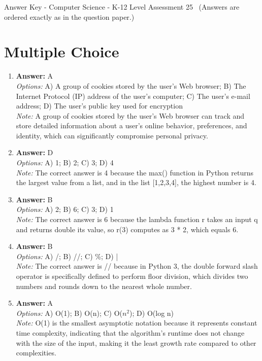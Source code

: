 \documentclass[12pt]{article}
\begin{document}
\begin{center}
Answer Key - Computer Science - K-12 Level Assessment 25 \
\small (Answers are ordered exactly as in the question paper.)
\end{center}

\section*{Multiple Choice}
\begin{enumerate}[label=\arabic*.]
\item \textbf{Answer:} A
\\ \textit{Options:} A) A group of cookies stored by the user's Web browser; B) The Internet Protocol (IP) address of the user's computer; C) The user's e-mail address; D) The user's public key used for encryption
\\ \textit{Note:} A group of cookies stored by the user's Web browser can track and store detailed information about a user's online behavior, preferences, and identity, which can significantly compromise personal privacy.
\item \textbf{Answer:} D
\\ \textit{Options:} A) 1; B) 2; C) 3; D) 4
\\ \textit{Note:} The correct answer is 4 because the max() function in Python returns the largest value from a list, and in the list [1,2,3,4], the highest number is 4.
\item \textbf{Answer:} B
\\ \textit{Options:} A) 2; B) 6; C) 3; D) 1
\\ \textit{Note:} The correct answer is 6 because the lambda function r takes an input q and returns double its value, so r(3) computes as 3 * 2, which equals 6.
\item \textbf{Answer:} B
\\ \textit{Options:} A) /; B) //; C) \%; D) |
\\ \textit{Note:} The correct answer is // because in Python 3, the double forward slash operator is specifically defined to perform floor division, which divides two numbers and rounds down to the nearest whole number.
\item \textbf{Answer:} A
\\ \textit{Options:} A) O(1); B) O(n); C) O($n^2$); D) O(log n)
\\ \textit{Note:} O(1) is the smallest asymptotic notation because it represents constant time complexity, indicating that the algorithm's runtime does not change with the size of the input, making it the least growth rate compared to other complexities.
\end{enumerate}
\end{document}
